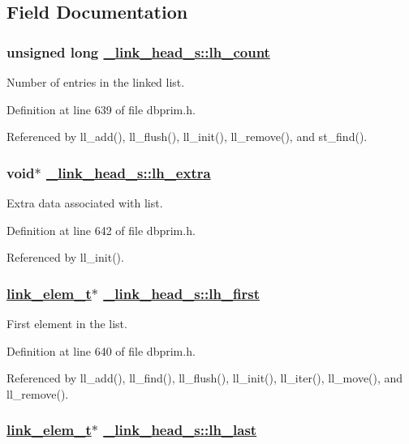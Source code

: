 \subsection{Field Documentation}
\hypertarget{struct__link__head__s_o1}{
\subsubsection[lh\_\-count]{\setlength{\rightskip}{0pt plus 5cm}unsigned long \hyperlink{struct__link__head__s_o1}{\_\-link\_\-head\_\-s::lh\_\-count}}}
\label{struct__link__head__s_o1}


Number of entries in the linked list. 

Definition at line 639 of file dbprim.h.

Referenced by ll\_\-add(), ll\_\-flush(), ll\_\-init(), ll\_\-remove(), and st\_\-find().\hypertarget{struct__link__head__s_o4}{
\subsubsection[lh\_\-extra]{\setlength{\rightskip}{0pt plus 5cm}void$\ast$ \hyperlink{struct__link__head__s_o4}{\_\-link\_\-head\_\-s::lh\_\-extra}}}
\label{struct__link__head__s_o4}


Extra data associated with list. 

Definition at line 642 of file dbprim.h.

Referenced by ll\_\-init().\hypertarget{struct__link__head__s_o2}{
\subsubsection[lh\_\-first]{\setlength{\rightskip}{0pt plus 5cm}\hyperlink{struct__link__elem__s}{link\_\-elem\_\-t}$\ast$ \hyperlink{struct__link__head__s_o2}{\_\-link\_\-head\_\-s::lh\_\-first}}}
\label{struct__link__head__s_o2}


First element in the list. 

Definition at line 640 of file dbprim.h.

Referenced by ll\_\-add(), ll\_\-find(), ll\_\-flush(), ll\_\-init(), ll\_\-iter(), ll\_\-move(), and ll\_\-remove().\hypertarget{struct__link__head__s_o3}{
\subsubsection[lh\_\-last]{\setlength{\rightskip}{0pt plus 5cm}\hyperlink{struct__link__elem__s}{link\_\-elem\_\-t}$\ast$ \hyperlink{struct__link__head__s_o3}{\_\-link\_\-head\_\-s::lh\_\-last}}}
\label{struct__link__head__s_o3}


